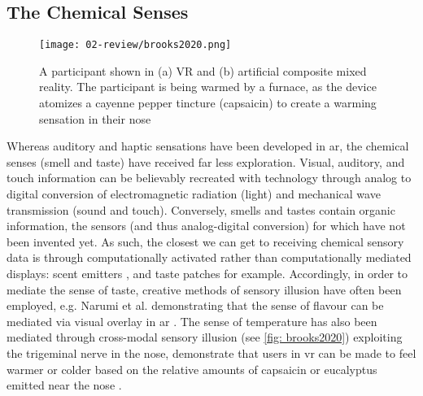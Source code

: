 \subsection{The Chemical Senses}\label{sec: ar-sensory-chemical}
\begin{wrapfigure}{r}{0.45\textwidth}
    \vspace{-\intextsep}
    \hfill
    \begin{minipage}{0.95\linewidth}
            \texttt{[image: 02-review/brooks2020.png]}
            \captionsetup{justification=justified}
            \caption{A participant shown in (a) VR and (b) artificial composite mixed reality. The participant is being warmed by a furnace, as the device atomizes a cayenne pepper tincture (capsaicin) to create a warming sensation in their nose \citep[in][]{brooks2020}}\label{fig: brooks2020}
    \end{minipage}
\end{wrapfigure}
Whereas auditory and haptic sensations have been developed in \gls{ar}, the chemical senses (smell and taste) have received far less exploration. Visual, auditory, and touch information can be believably recreated with technology through analog to digital conversion of electromagnetic radiation (light) and mechanical wave transmission (sound and touch). Conversely, smells and tastes contain organic information, the sensors (and thus analog-digital conversion) for which have not been invented yet. As such, the closest we can get to receiving chemical sensory data is through computationally activated rather than computationally mediated displays: scent emitters \citep{maggioni2019}, and taste patches for example. Accordingly, in order to mediate the sense of taste, creative methods of sensory illusion have often been employed, e.g. Narumi et al. demonstrating that the sense of flavour can be mediated via visual overlay in \gls{ar} \citep{narumi2011}. The sense of temperature has also been mediated through cross-modal sensory illusion (see \autoref{fig: brooks2020}) exploiting the trigeminal nerve in the nose, \citeauthor{brooks2020} demonstrate that users in \gls{vr} can be made to feel warmer or colder based on the relative amounts of capsaicin or eucalyptus emitted near the nose \citeyearpar{brooks2020}.



